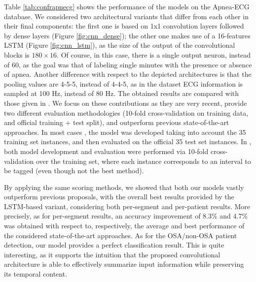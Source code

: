 \documentclass[5p,twocolumn,lefttitle]{elsarticle}
\begin{document}
Table \ref{tab:confrapnecg} shows the performance of the models on the Apnea-ECG database. We considered two architectural variants that differ from each other in their final components: the first one is based on 1x1 convolution layers followed by dense layers (Figure \ref{fig:cnn_dense}); the other one makes use of a 16-features LSTM (Figure \ref{fig:cnn_lstm}), as the size of the output of the convolutional blocks is $180 \times 16$. Of course, in this case, there is a single output neuron, instead of 60, as the goal was that of labeling single minutes with the presence or absence of apnea. Another difference with respect to the depicted architectures is that the pooling values are 4-5-5, instead of 4-4-5, as in the dataset ECG information is sampled at 100 Hz, instead of 80 Hz. The obtained results are compared with those given in \cite{DBLP:conf/cinc/SadrC14,DBLP:journals/cbm/SharmaS16,DBLP:journals/tbe/SongLZCX16,li2018method,singh2019novel,DBLP:journals/sensors/ChangYLL20,almutairi2020detection,sharma2020sleep,feng2020sleep,shen2021multiscale,martin2017heart,wang2019sleep,fatimah2020detection}. We focus on these contributions as they are very recent, provide two different evaluation methodologies (10-fold cross-validation on training data, and official training + test split), and outperform previous state-of-the-art approaches. In most cases \cite{DBLP:conf/cinc/SadrC14,DBLP:journals/cbm/SharmaS16,DBLP:journals/tbe/SongLZCX16,li2018method,singh2019novel,DBLP:journals/sensors/ChangYLL20,sharma2020sleep,feng2020sleep,shen2021multiscale,martin2017heart,wang2019sleep}, the model was developed taking into account the 35 training set instances, and then evaluated on the official 35 test set instances. In \cite{almutairi2020detection,fatimah2020detection}, both model development and evaluation were performed via 10-fold cross-validation over the training set, where each instance corresponds to an interval to be tagged (even though not the best method). 

By applying the same scoring methods, we showed that both our models vastly outperform previous proposals, with the overall best results provided by the LSTM-based variant, considering both per-segment and per-patient results. More precisely, as for per-segment results, an accuracy improvement of 8.3\% and 4.7\% was obtained with respect to, respectively, the average and best performance of the considered state-of-the-art approaches. As for the OSA/non-OSA patient detection, our model provides a perfect classification result. 
This is quite interesting, as it supports the intuition that the proposed convolutional architecture is able to effectively summarize input information while preserving its temporal content. 
\end{document}
